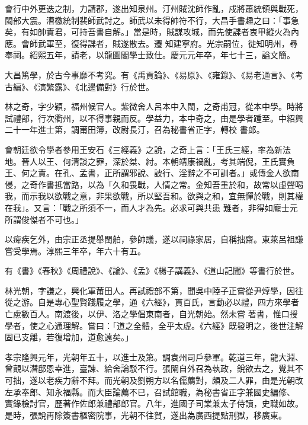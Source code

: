 \begin{pinyinscope}
 會行中外更迭之制，力請郡，遂出知泉州。汀州賊沈師作亂，戍將蕭統領與戰死，閩部大震。漕檄統制裴師武討之。師武以未得帥符不行，大昌手書趣之曰：「事急矣，有如帥責君，可持吾書自解。」當是時，賊謀攻城，而先使諜者衷甲縱火為內應。會師武軍至，復得諜者，賊遂散去。遷
 知建寧府。光宗嗣位，徙知明州，尋奉祠。紹熙五年，請老，以龍圖閣學士致仕。慶元元年卒，年七十三，謚文簡。



 大昌篤學，於古今事靡不考究。有《禹貢論》、《易原》、《雍錄》、《易老通言》、《考古編》、《演繁露》、《北邊備對》行於世。



 林之奇，字少穎，福州候官人。紫微舍人呂本中入閩，之奇甫冠，從本中學。時將試禮部，行次衢州，以不得事親而反。學益力，本中奇之，由是學者踵至。中紹興二十一年進士第，調莆田簿，改尉長汀，召為秘書省正字，轉校
 書郎。



 會朝廷欲令學者參用王安石《三經義》之說，之奇上言：「王氏三經，率為新法地。晉人以王、何清談之罪，深於桀、紂。本朝靖康禍亂，考其端倪，王氏實負王、何之責。在孔、孟書，正所謂邪說、詖行、淫辭之不可訓者。」或傳金人欲南侵，之奇作書抵當路，以為「久和畏戰，人情之常。金知吾重於和，故常以虛聲喝我，而示我以欲戰之意，非果欲戰，所以堅吾和。欲與之和，宜無憚於戰，則其權在我」。又言：「戰之所須不一，而人才為先。必求可與共患
 難者，非得如龐士元所謂俊傑者不可也。」



 以痺疾乞外，由宗正丞提舉閩舶，參帥議，遂以祠祿家居，自稱拙齋。東萊呂祖謙嘗受學焉。淳熙三年卒，年六十有五。



 有《書》《春秋》《周禮說》、《論》、《孟》《楊子講義》、《道山記聞》等書行於世。



 林光朝，字謙之，興化軍莆田人。再試禮部不第，聞吳中陸子正嘗從尹焞學，因往從之游。自是專心聖賢踐履之學，通《六經》，貫百氏，言動必以禮，四方來學者亡慮數百人。南渡後，以伊、洛之學倡東南者，自光朝始。然未嘗
 著書，惟口授學者，使之心通理解。嘗曰：「道之全體，全乎太虛。《六經》既發明之，後世注解固已支離，若復增加，道愈遠矣。」



 孝宗隆興元年，光朝年五十，以進士及第。調袁州司戶參軍。乾道三年，龍大淵、曾覿以潛邸恩幸進，臺諫、給舍論駁不行。張闡自外召為執政，銳欲去之，覺其不可拙，遂以老疾力辭不拜。而光朝及劉朔方以名儒薦對，頗及二人罪，由是光朝改左承奉郎、知永福縣。而大臣論薦不已，召試館職，為秘書省正字兼國史編修、
 實錄檢討官，歷著作佐郎兼禮部郎官。八年，進國子司業兼太子侍讀，史職如故。是時，張說再除簽書樞密院事，光朝不往賀，遂出為廣西提點刑獄，移廣東。




\end{pinyinscope}
